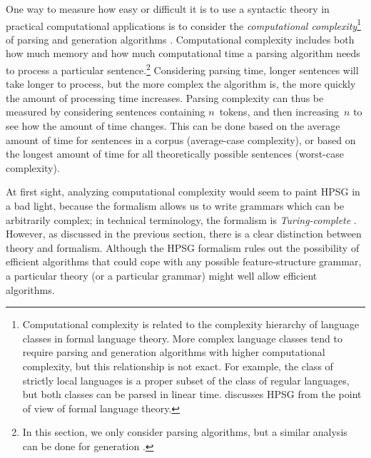 \documentclass[output=paper,nonflat]{langsci/langscibook}
\begin{document}
One way to measure how easy or difficult it is
to use a syntactic theory in practical computational applications
is to consider the \textit{computational complexity}\footnote{%
	Computational complexity is related to
	the complexity hierarchy of language classes in formal language theory.
	More complex language classes tend to require
	parsing and generation algorithms with higher computational complexity,
	but this relationship is not exact.
	For example, the class of strictly local languages is a proper subset of the class of regular languages,
	but both classes can be parsed in linear time.
	\citet[ch.~17]{MuellerGT-Eng3} discusses HPSG from the point of view of formal language theory.
}
of parsing and generation algorithms \citep{gazdar1985complexity}.
Computational complexity includes both how much memory
and how much computational time
a parsing algorithm needs to process a particular sentence.\footnote{%
  In this section, we only consider parsing
  algorithms, but a similar analysis can be done for generation
  \citep[\eg][]{carroll1999generate}.}
Considering parsing time, longer sentences will take longer to process,
but the more complex the algorithm is,
the more quickly the amount of processing time increases.
Parsing complexity can thus be measured by considering sentences containing $n$~tokens,
and then increasing~$n$ to see how the amount of time changes.
This can be done based on the average amount of time
for sentences in a corpus (average-case complexity),
or based on the longest amount of time
for all theoretically possible sentences (worst-case complexity).

At first sight, analyzing computational complexity
would seem to paint HPSG in a bad light,
because the formalism allows us to write grammars
which can be arbitrarily complex;
in technical terminology, the formalism is \textit{Turing-complete}
\citep[Section~3.4]{Johnson88}.
However, as discussed in the previous section,
there is a clear distinction between theory and formalism.
Although the HPSG formalism rules out the possibility of efficient algorithms
that could cope with any possible feature-structure grammar,
a particular theory (or a particular grammar) might well allow efficient algorithms.
\end{document}
